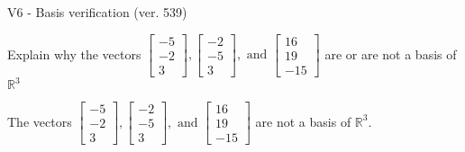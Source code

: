 \begin{exercise}
  \begin{exerciseTitle}V6 - Basis verification (ver. 539)\end{exerciseTitle}
  \begin{exerciseStatement}
    Explain why the vectors \(\left[\begin{array}{r}
-5 \\
-2 \\
3
\end{array}\right] , \left[\begin{array}{r}
-2 \\
-5 \\
3
\end{array}\right] , \text{ and } \left[\begin{array}{r}
16 \\
19 \\
-15
\end{array}\right]\) are or are not a basis of \(\mathbb{R}^3\)	


  \end{exerciseStatement}
  \begin{exerciseAnswer}
   The vectors \(\left[\begin{array}{r}
-5 \\
-2 \\
3
\end{array}\right] , \left[\begin{array}{r}
-2 \\
-5 \\
3
\end{array}\right] , \text{ and } \left[\begin{array}{r}
16 \\
19 \\
-15
\end{array}\right]\) 
  	 are not  a basis of \(\mathbb{R}^3\).
  


  \end{exerciseAnswer}
\end{exercise}